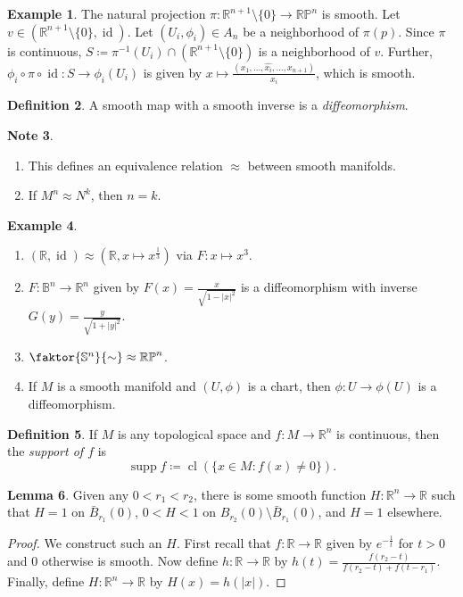 \documentclass[10pt,letterpaper,cm]{nupset}
\theoremstyle{definition}
\newtheorem{definition}{Definition}[subsection]
\newtheorem{exmp}[definition]{Example}
\newtheorem{note}[definition]{Note}
\theoremstyle{theorem}
\newtheorem{lemma}[definition]{Lemma}
\theoremstyle{remark}
\newcommand{\R}{\mathbb R}
\newcommand{\RP}{\mathbb{RP}}
\renewcommand{\S}{\mathbb S}
\newcommand{\B}{\mathbb{B}}
\newcommand{\1}{\mathbf{1}}
\newcommand{\0}{\vec 0}
\DeclareMathOperator{\id}{id}
\DeclareMathOperator{\supp}{supp}
\DeclareMathOperator{\cl}{cl}
\begin{document}
\begin{exmp}
The natural projection $\pi : \R^{n+1}\setminus \{0\} \to \RP^n$ is smooth. Let $v \in (\R^{n+1} \setminus \{0\}, \id)$. Let $(U_i, \phi_i) \in A_n$ be a neighborhood of $\pi(p)$. Since $\pi$ is continuous, $S \coloneqq  \pi^{-1}(U_i) \cap  (\R^{n+1} \setminus \{0\})$ is a neighborhood of $v$. Further, $\phi_i \circ \pi \circ \id : S \to \phi_i(U_i)$ is given by $x\mapsto \frac{(x_1, \ldots, \widehat{x_i}, \ldots, x_{n+1})}{x_i}$, which is smooth.
\end{exmp}

\begin{definition} 
A smooth map with a smooth inverse is a \textit{diffeomorphism}.
\end{definition}

\begin{note} $ $
\begin{enumerate}
\item This defines an equivalence relation $\approx$ between smooth manifolds. 
\item If $M^n \approx N^k$, then $n =k$.
\end{enumerate}
\end{note}


\begin{exmp} $ $
\begin{enumerate}
\item $\left(\R, \id\right) \approx \left(\R, x\mapsto x^{\frac{1}{3}}\right)$ via $F: x \mapsto x^3$.
\item $F: \B^n \to \R^n$ given by $F(x) = \frac{x}{\sqrt{1-|x|^2}}$ is a diffeomorphism with inverse $G(y) = \frac{y}{\sqrt{1+|y|^2}}$.
\item  $\faktor{\S^n}{\sim} \approx \RP^n$.
\item If $M$ is a smooth manifold and $(U, \phi)$ is a chart, then $\phi: U \to \phi(U)$ is a diffeomorphism.
\end{enumerate}
\end{exmp}

\begin{definition}
If $M$ is any topological space and $f:M \to \R^n$ is continuous, then the \textit{support of $f$} is $$\supp f \coloneqq  \cl\left(\{x \in M: f(x) \ne 0\}\right).$$
\end{definition}

\begin{lemma}
Given any $0<r_1<r_2$, there is some smooth function $H: \R^n \to \R$ such that $H =1$ on $\bar{B}_{r_1}(0)$, $0<H <1$ on $B_{r_2}(0)\setminus \bar{B}_{r_1}(0)$, and $H=1$ elsewhere. 
\end{lemma}
\begin{proof}\label{l5}
We construct such an $H$. First recall that $f: \R \to \R$ given by $e^{-\frac{1}{t}}$ for $t>0$ and $0$ otherwise is smooth. Now define $h: \R \to \R$ by $h(t) = \frac{f(r_2-t)}{f(r_2-t)+ f(t-r_1)}$. Finally, define $H: \R^n \to \R$ by $H(x) = h(|x|)$.
\end{proof}
\end{document}

